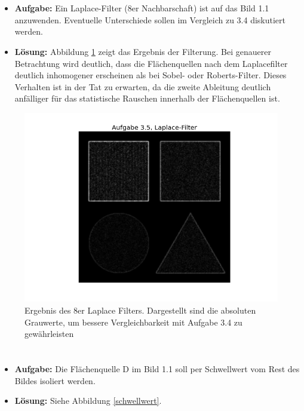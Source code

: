 \documentclass[12pt, a4paper, twoside]{report}
\begin{document}
\section{}
\begin{itemize}
\item \textbf{Aufgabe:} Ein Laplace-Filter (8er Nachbarschaft) ist auf das Bild 1.1 anzuwenden. Eventuelle Unterschiede sollen im Vergleich zu 3.4 diskutiert werden.
\item \textbf{Lösung:} Abbildung \ref{laplace} zeigt das Ergebnis der Filterung. Bei genauerer Betrachtung wird deutlich, dass die Flächenquellen nach dem Laplacefilter deutlich inhomogener erscheinen als bei Sobel- oder Roberts-Filter. Dieses Verhalten ist in der Tat zu erwarten, da die zweite Ableitung deutlich anfälliger für das statistische Rauschen innerhalb der Flächenquellen ist.
\end{itemize}

\begin{figure}[h]
\centering
\includegraphics[width=\textwidth]{../bilder/laplace_abs.png}
\caption{Ergebnis des 8er Laplace Filters. Dargestellt sind die absoluten Grauwerte, um bessere Vergleichbarkeit mit Aufgabe 3.4 zu gewährleisten}
\label{laplace}
\end{figure}

\section{}
\begin{itemize}
\item \textbf{Aufgabe:} Die Flächenquelle D im Bild 1.1 soll per Schwellwert vom Rest des Bildes isoliert werden.
\item \textbf{Lösung:} Siehe Abbildung \ref{schwellwert}.
\end{itemize}
\end{document}

